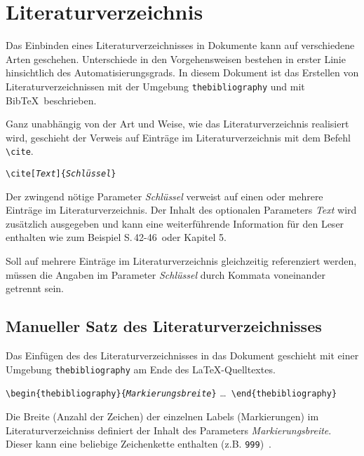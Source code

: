 \chapter{Literaturverzeichnis}
\label{Kapitel_Literaturverzeichnis}

Das Einbinden eines Literaturverzeichnisses in Dokumente kann auf verschiedene Arten geschehen. Unterschiede in den Vorgehensweisen bestehen in erster Linie hinsichtlich des Automatisierungsgrads. In diesem Dokument ist das Erstellen von Literaturverzeichnissen mit der Umgebung \verb!thebibliography! und mit Bib\TeX\ beschrieben.

Ganz unabhängig von der Art und Weise, wie das Literaturverzeichnis realisiert wird, geschieht der Verweis auf Einträge im Literaturverzeichnis mit dem Befehl \verb|\cite|.

\begin{boxedminipage}{\textwidth}
	\texttt{\textbackslash cite[\textsl{Text}]\{\textsl{Schlüssel}\}} 
\end{boxedminipage}

Der zwingend nötige Parameter \textsl{Schlüssel} verweist auf einen oder mehrere Einträge im Literaturverzeichnis. Der Inhalt des optionalen Parameters  \textsl{Text} wird zusätzlich ausgegeben und kann eine weiterführende Information für den Leser enthalten wie zum Beispiel \glqq S.\,42-46\grqq\ oder \glqq Kapitel 5\grqq.

Soll auf mehrere Einträge im Literaturverzeichnis gleichzeitig referenziert werden, müssen die Angaben im Parameter \textsl{Schlüssel} durch Kommata voneinander getrennt sein.

\section{Manueller Satz des Literaturverzeichnisses}
\label{Abschnitt_thebibliography}

Das Einfügen des des Literaturverzeichnisses in das Dokument geschieht mit einer Umgebung \verb!thebibliography! am Ende des \LaTeX-Quelltextes.

\begin{boxedminipage}{\textwidth}
	\texttt{\textbackslash begin\{thebibliography\}\{\textsl{Markierungsbreite}\}} \enskip \dots\ \enskip \texttt{\textbackslash end\{thebibliography\}} 
\end{boxedminipage}

Die Breite (Anzahl der Zeichen) der einzelnen Labels (Markierungen) im Literaturverzeichniss definiert der Inhalt des Parameters \textsl{Markierungsbreite}. Dieser kann eine beliebige Zeichenkette enthalten (z.B. \verb|999|)~\cite{voss2007referenz}.

